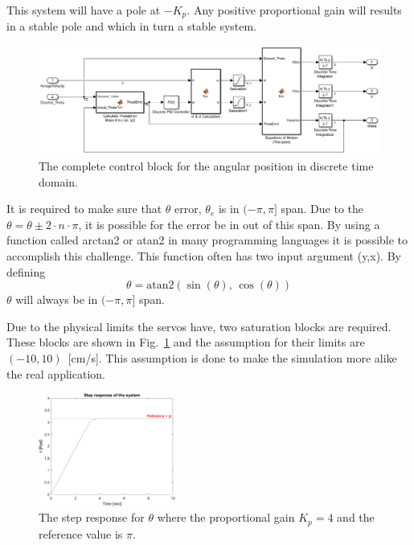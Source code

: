 This system will have a pole at $-K_p$.
Any positive proportional gain will results in a stable pole and which in turn a stable system.
\begin{figure}[ht]
\centering
\includegraphics[width=\textwidth]{sections/assets/Theta_PID.PNG}
\caption{The complete control block for the angular position in discrete time domain.}
\label{fig:PID1}
\end{figure}

It is required to make sure that $\theta$ error, $\theta_e$ is in $(-\pi,\pi]$ span. Due to the $\theta = \theta \pm 2 \cdot n \cdot \pi$, it is possible for the error be in out of this span.
By using a function called arctan2 or atan2 in many programming languages it is possible to accomplish this challenge.
This function often has two input argument (y,x).
By defining
\begin{equation}
\theta = \text{atan2}(\sin(\theta),\, \cos(\theta))
\end{equation}
$\theta$ will always be in $(-\pi,\pi]$ span.

Due to the physical limits the servos have, two saturation blocks are required.
These blocks are shown in Fig.~\ref{fig:PID1} and the assumption for their limits are $(-10,10)$~[cm/s].
This assumption is done to make the simulation more alike the real application.
\begin{figure}[ht]
\centering
\includegraphics[width=0.4\textwidth]{sections/assets/Theta_pi_stepresponse.png}
\caption{The step response for $\theta$ where the proportional gain $K_p = 4$ and the reference value is $\pi$.}
\label{fig:Theta_Step}
\end{figure}

